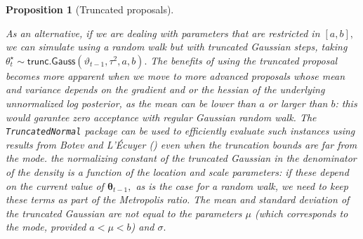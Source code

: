 \documentclass[
  11pt,
  letterpaper,
]{scrbook}
\theoremstyle{definition}
\theoremstyle{plain}
\newtheorem{proposition}{Proposition}[chapter]
\theoremstyle{plain}
\theoremstyle{plain}
\theoremstyle{definition}
\theoremstyle{definition}
\theoremstyle{plain}
\newtheorem{proposition}{Proposition}[chapter]
\theoremstyle{plain}
\theoremstyle{remark}
\begin{document}
\begin{proposition}[Truncated
proposals]\protect\hypertarget{prp-truncated-proposals}{}\label{prp-truncated-proposals}

As an alternative, if we are dealing with parameters that are restricted
in \([a,b],\) we can simulate using a random walk but with truncated
Gaussian steps, taking
\(\theta^{\star}_{t} \sim \mathsf{trunc. Gauss}(\vartheta_{t-1}, \tau^2, a, b).\)
The benefits of using the truncated proposal becomes more apparent when
we move to more advanced proposals whose mean and variance depends on
the gradient and or the hessian of the underlying unnormalized log
posterior, as the mean can be lower than \(a\) or larger than \(b\):
this would garantee zero acceptance with regular Gaussian random walk.
The \texttt{TruncatedNormal} package can be used to efficiently evaluate
such instances using results from Botev and L'Écuyer
() even when the truncation
bounds are far from the mode. the normalizing constant of the truncated
Gaussian in the denominator of the density is a function of the location
and scale parameters: if these depend on the current value of
\(\boldsymbol{\theta}_{t-1},\) as is the case for a random walk, we need
to keep these terms as part of the Metropolis ratio. The mean and
standard deviation of the truncated Gaussian are not equal to the
parameters \(\mu\) (which corresponds to the mode, provided
\(a < \mu < b\)) and \(\sigma.\)

\end{proposition}
\end{document}

